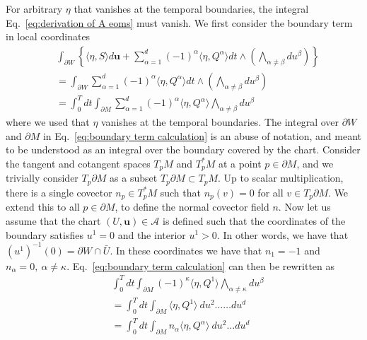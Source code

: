 For arbitrary $\eta$ that vanishes at the temporal boundaries, the integral Eq.~\ref{eq:derivation of A eoms} must vanish. We first consider the boundary term in local coordinates
\begin{equation} \label{eq:boundary term calculation}
\begin{aligned}
& \int_{\partial W} \left\{ \langle \eta, S \rangle d \mathbf{u} + \sum_{\alpha=1}^d (-1)^\alpha \langle \eta, Q^\alpha \rangle dt \wedge \left( \bigwedge_{\alpha \neq \beta} d u^\beta \right)  \right\} \\
 & = \int_{\partial W}  \sum_{\alpha=1}^d (-1)^\alpha \langle \eta, Q^\alpha \rangle dt \wedge \left( \bigwedge_{\alpha \neq \beta} d u^\beta \right)  \\
  & = \int_0^T dt \int_{\partial M} \sum_{\alpha=1}^d (-1)^\alpha \langle \eta, Q^\alpha \rangle  \bigwedge_{\alpha \neq \beta} d u^\beta 
\end{aligned}
\end{equation}
where we used that $\eta$ vanishes at the temporal boundaries. The integral over $\partial W$ and $\partial M$ in Eq.~\ref{eq:boundary term calculation} is an abuse of notation, and meant to be understood as an integral over the boundary covered by the chart. Consider the tangent and cotangent spaces $T_p M$ and $T^*_p M$ at a point $p \in \partial M$, and we trivially consider $T_p \partial M$ as a subset $T_p \partial M \subset T_p M$. Up to scalar multiplication, there is a single covector $n_p \in T^*_p M$ such that $n_p(v) = 0$ for all $v \in T_p \partial M$. We extend this to all $p \in \partial M$, to define the normal covector field $n$. Now let us assume that the chart $(U, \mathbf{u}) \in \mathcal{A}$ is defined such that the coordinates of the boundary satisfies $u^1 = 0$ and the interior $u^1 > 0$. In other words, we have that $(u^1)^{-1}(0) = \partial W \cap \bar{U}$. In these coordinates we have that $n_1 = -1$ and $n_\alpha = 0,\ \alpha \neq \kappa$. Eq.~\ref{eq:boundary term calculation} can then be rewritten as
\begin{equation} \label{eq:boundary term calculation 2}
\begin{aligned}
& \int_0^T dt \int_{\partial M} (-1)^\kappa \langle \eta, Q^1 \rangle \bigwedge_{\alpha \neq \kappa} d u^\beta  \\
& = \int_0^T dt \int_{\partial M} \langle \eta, Q^1 \rangle\ du^2 \dots \dots du^d \\
& = \int_0^T dt \int_{\partial M} n_\alpha \langle \eta, Q^\alpha \rangle\ du^2 \dots du^d
\end{aligned}
\end{equation}
